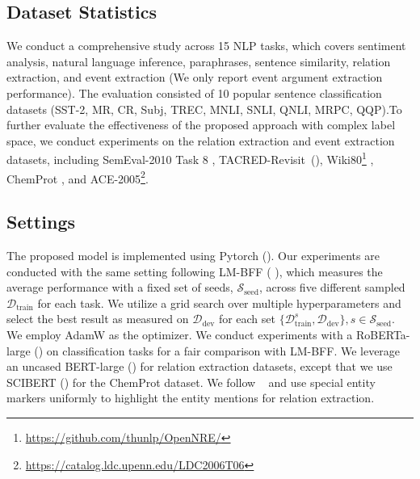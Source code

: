 \documentclass{article} \usepackage{iclr2022_conference,times}
\newcommand{\dtrain}{\mathcal{D}_{\text{train}}}
\newcommand{\ddev}{\mathcal{D}_{\text{dev}}}
\newcommand{\seedset}{\mathcal{S}_{\text{seed}}}
\begin{document}
\subsection{Dataset Statistics}
We conduct a comprehensive study across 15 NLP tasks, which covers sentiment analysis, natural language inference, paraphrases, sentence similarity, relation extraction, and event extraction (We only report event argument extraction performance). 
The evaluation consisted of 10  popular sentence classification datasets (SST-2, MR, CR, Subj, TREC, MNLI, SNLI, QNLI, MRPC, QQP).To further evaluate the effectiveness of the proposed approach with complex label space, we conduct experiments on the relation extraction and event extraction datasets, including SemEval-2010 Task 8 \citep{DBLP:conf/semeval/HendrickxKKNSPP10}, TACRED-Revisit~(\cite{DBLP:conf/acl/AltGH20a}), Wiki80\footnote{\url{https://github.com/thunlp/OpenNRE/}} \citep{DBLP:conf/emnlp/HanGYYLS19}, ChemProt \citep{DBLP:journals/biodb/KringelumKBLOT16}, and ACE-2005\footnote{\url{https://catalog.ldc.upenn.edu/LDC2006T06}}.

\subsection{Settings}
\label{sec:setting}

The proposed model is implemented using Pytorch (\cite{DBLP:conf/nips/PaszkeGMLBCKLGA19}).
Our experiments are conducted with the same setting following LM-BFF ( \cite{DBLP:journals/corr/abs-2012-15723}), which measures the average performance with a fixed set of seeds, $\seedset$, across five different sampled $\dtrain$ for each task. 
We utilize a grid search over multiple hyperparameters and select the best result as measured on $\ddev$ for each set $\{\dtrain^s, \ddev\}, s\in \seedset$.
We employ AdamW as the optimizer. 
We conduct experiments with a RoBERTa-large (\cite{DBLP:journals/corr/abs-1907-11692}) on classification tasks for a fair comparison with LM-BFF.
We leverage an uncased BERT-large (\cite{DBLP:conf/naacl/DevlinCLT19}) for relation extraction datasets, except that we use SCIBERT (\cite{DBLP:conf/emnlp/BeltagyLC19}) for the ChemProt dataset. 
We follow ~\cite{DBLP:conf/acl/SoaresFLK19} and use special entity markers uniformly to highlight the entity mentions for relation extraction. 
\end{document}

